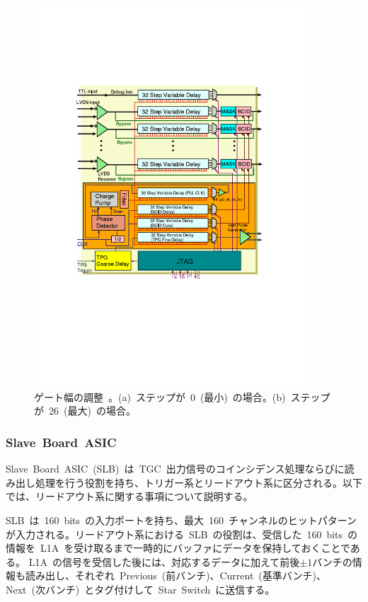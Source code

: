 \begin{figure}[tbp]
        \begin{minipage}{0.49\hsize}
        \centering
        \includegraphics[width=0.9\textwidth,page=4]{img/pdf/PP.pdf}
        \subcaption{}
        \end{minipage}
        \caption[ゲート幅の調整]{ゲート幅の調整~\cite{URL:05}。(a)~ステップが~0~(最小)~の場合。(b)~ステップが~26~(最大)~の場合。}
        \label{fig:bcidgate}
\end{figure}

\subsubsection{Slave~Board~ASIC}
Slave~Board~ASIC~(SLB)~は~TGC~出力信号のコインシデンス処理ならびに読み出し処理を行う役割を持ち、トリガー系とリードアウト系に区分される。以下では、リードアウト系に関する事項について説明する。

SLB~は~160~bits~の入力ポートを持ち、最大~160~チャンネルのヒットパターンが入力される。リードアウト系における~SLB~の役割は、受信した~160~bits~の情報を~L1A~を受け取るまで一時的にバッファにデータを保持しておくことである。
L1A~の信号を受信した後には、対応するデータに加えて前後$\pm1$バンチの情報も読み出し、それぞれ~Previous~(前バンチ)、Current~(基準バンチ)、Next~(次バンチ)~とタグ付けして~Star~Switch~に送信する。

